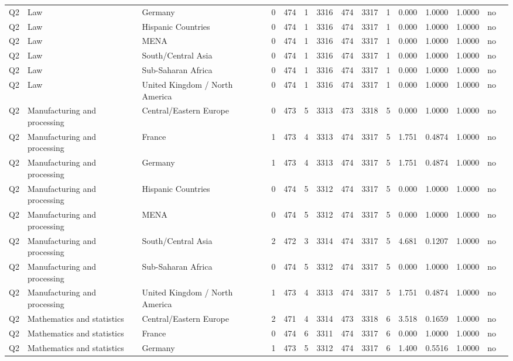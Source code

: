 \begin{longtable}{lllrcccccccccll}
Q2 & Law & Germany & 0 & 474 & 1 & 3316 & 474 & 3317 & 1 & 0.000 & 1.0000 & 1.0000 & no \\
Q2 & Law & Hispanic Countries & 0 & 474 & 1 & 3316 & 474 & 3317 & 1 & 0.000 & 1.0000 & 1.0000 & no \\
Q2 & Law & MENA & 0 & 474 & 1 & 3316 & 474 & 3317 & 1 & 0.000 & 1.0000 & 1.0000 & no \\
Q2 & Law & South/Central Asia & 0 & 474 & 1 & 3316 & 474 & 3317 & 1 & 0.000 & 1.0000 & 1.0000 & no \\
Q2 & Law & Sub-Saharan Africa & 0 & 474 & 1 & 3316 & 474 & 3317 & 1 & 0.000 & 1.0000 & 1.0000 & no \\
Q2 & Law & United Kingdom / North America & 0 & 474 & 1 & 3316 & 474 & 3317 & 1 & 0.000 & 1.0000 & 1.0000 & no \\
Q2 & Manufacturing and processing & Central/Eastern Europe & 0 & 473 & 5 & 3313 & 473 & 3318 & 5 & 0.000 & 1.0000 & 1.0000 & no \\
Q2 & Manufacturing and processing & France & 1 & 473 & 4 & 3313 & 474 & 3317 & 5 & 1.751 & 0.4874 & 1.0000 & no \\
Q2 & Manufacturing and processing & Germany & 1 & 473 & 4 & 3313 & 474 & 3317 & 5 & 1.751 & 0.4874 & 1.0000 & no \\
Q2 & Manufacturing and processing & Hispanic Countries & 0 & 474 & 5 & 3312 & 474 & 3317 & 5 & 0.000 & 1.0000 & 1.0000 & no \\
Q2 & Manufacturing and processing & MENA & 0 & 474 & 5 & 3312 & 474 & 3317 & 5 & 0.000 & 1.0000 & 1.0000 & no \\
Q2 & Manufacturing and processing & South/Central Asia & 2 & 472 & 3 & 3314 & 474 & 3317 & 5 & 4.681 & 0.1207 & 1.0000 & no \\
Q2 & Manufacturing and processing & Sub-Saharan Africa & 0 & 474 & 5 & 3312 & 474 & 3317 & 5 & 0.000 & 1.0000 & 1.0000 & no \\
Q2 & Manufacturing and processing & United Kingdom / North America & 1 & 473 & 4 & 3313 & 474 & 3317 & 5 & 1.751 & 0.4874 & 1.0000 & no \\
Q2 & Mathematics and statistics & Central/Eastern Europe & 2 & 471 & 4 & 3314 & 473 & 3318 & 6 & 3.518 & 0.1659 & 1.0000 & no \\
Q2 & Mathematics and statistics & France & 0 & 474 & 6 & 3311 & 474 & 3317 & 6 & 0.000 & 1.0000 & 1.0000 & no \\
Q2 & Mathematics and statistics & Germany & 1 & 473 & 5 & 3312 & 474 & 3317 & 6 & 1.400 & 0.5516 & 1.0000 & no \\

\end{longtable}
